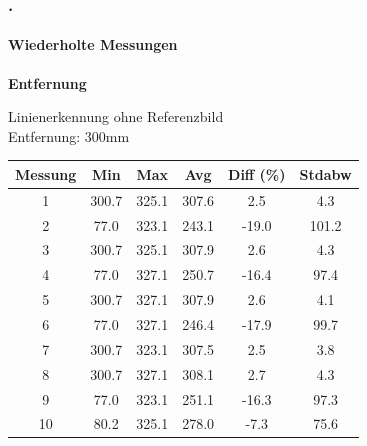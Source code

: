 \documentclass[xcolor=dvipsnames]{beamer}
\def\frametitlesec{\frametitle{\arabic{section}.\hspace{0.5ex}\insertsection}}
\def\framesubtitles#1{\framesubtitle{\hspace{3.5ex}#1}}
\begin{document}
\begin{frame}
	\frametitlesec
	\framesubtitles{Wiederholte Messungen}

	\textbf{Entfernung}

	Linienerkennung ohne Referenzbild\\
	Entfernung: 300mm
	\vfill

	\begin{tabular}{c|c|c|c|c|c}
		Messung & Min & Max & Avg & Diff (\%) & Stdabw \\ \hline
		1 & 300.7 & 325.1 & 307.6 & 2.5 & 4.3\\
		2 & 77.0 & 323.1 & 243.1 & -19.0 & 101.2\\
		3 & 300.7 & 325.1 & 307.9 & 2.6 & 4.3\\
		4 & 77.0 & 327.1 & 250.7 & -16.4 & 97.4\\
		5 & 300.7 & 327.1 & 307.9 & 2.6 & 4.1\\
		6 & 77.0 & 327.1 & 246.4 & -17.9 & 99.7\\
		7 & 300.7 & 323.1 & 307.5 & 2.5 & 3.8\\
		8 & 300.7 & 327.1 & 308.1 & 2.7 & 4.3\\
		9 & 77.0 & 323.1 & 251.1 & -16.3 & 97.3\\
		10 & 80.2 & 325.1 & 278.0 & -7.3 & 75.6
	\end{tabular}

\end{frame}
\end{document}
